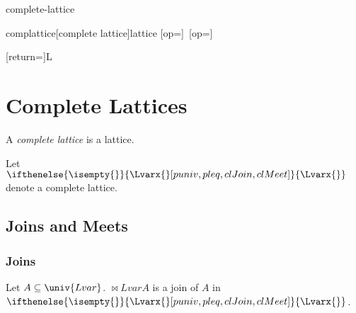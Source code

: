 \documentclass{stex}
\begin{document}
\begin{smodule}{complete-lattice}


  \begin{extstructure}{complattice}[complete lattice]{lattice}
    [op=\bigvee]{\bigvee\,}
    [op=\bigwedge]{\bigwedge\,}
  \end{extstructure}

  [return={\complattice[comp=##1]}]{\mathcal L}
  \newcommand\Lvar[1]{\ifthenelse{\isempty{#1}}{\Lvarx{}[puniv,pleq,clJoin,clMeet]}{\Lvarx{#1}}}

  \section{Complete Lattices}

  \begin{forthel}
  \end{forthel}
  
  \begin{forthel}
    \begin{signature}
      A \emph{complete lattice} is a lattice.
    \end{signature}

    Let $\Lvar{}$ denote a complete lattice.
  \end{forthel}
  
  \subsection{Joins and Meets}

  \subsubsection{Joins}
  
  \begin{forthel}
    \begin{signature}
      Let $A \subseteq \univ{Lvar}$.
      $\Join{Lvar} A$ is a join of $A$ in $\Lvar{}$.
    \end{signature}
    

\end{forthel}
\end{smodule}
\end{document}
